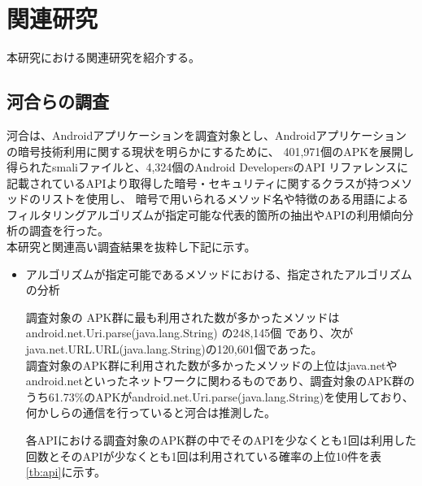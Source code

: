 \newpage
\section{関連研究} %
本研究における関連研究を紹介する。

\subsection{河合らの調査}
河合は、Androidアプリケーションを調査対象とし、Androidアプリケーションの暗号技術利用に関する現状を明らかにするために、
401,971個のAPKを展開し得られたsmaliファイルと、4,324個のAndroid DevelopersのAPI リファレンスに記載されているAPIより取得した暗号・セキュリティに関するクラスが持つメソッドのリストを使用し、
暗号で用いられるメソッド名や特徴のある用語によるフィルタリングアルゴリズムが指定可能な代表的箇所の抽出やAPIの利用傾向分析の調査を行った。
\\本研究と関連高い調査結果を抜粋し下記に示す。



\begin{itemize}
\item アルゴリズムが指定可能であるメソッドにおける、指定されたアルゴリズムの分析


調査対象の APK群に最も利用された数が多かったメソッドは
android.net.Uri.parse(java.lang.String) の248,145個
であり、次がjava.net.URL.URL(java.lang.String)の120,601個であった。
\\調査対象のAPK群に利用された数が多かったメソッドの上位はjava.netやandroid.netといったネットワークに関わるものであり、調査対象のAPK群のうち61.73\%のAPKがandroid.net.Uri.parse(java.lang.String)を使用しており、何かしらの通信を行っていると河合は推測した。

各APIにおける調査対象のAPK群の中でそのAPIを少なくとも1回は利用した回数とそのAPIが少なくとも1回は利用されている確率の上位10件を表\ref{tb:api}に示す。
\end{itemize}


